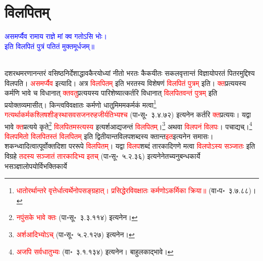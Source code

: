 \section[विलपितम्]{विलपितम्}
\centering\textcolor{blue}{असमर्प्यैव रामाय राज्ञे मां क्व गतोऽसि भोः।\nopagebreak\\
इति विलपितं पुत्रं पतितं मुक्तमूर्धजम्॥}\nopagebreak\\
\\
\begin{sloppypar}\justifying\noindent\hspace{10mm} दशरथ\-मरणानन्तरं वसिष्ठ\-निर्देशाद्धावकैरयोध्यां नीतो भरतः कैकयीतः सकल\-वृत्तान्तं विज्ञायोपरतं पितरमुद्दिश्य विलपति। \textcolor{red}{असमर्प्यैव} इत्यादि। अत्र \textcolor{red}{विलपितम्} इति भरतस्य विशेषणं \textcolor{red}{विलपितं पुत्रम्} इति। \textcolor{red}{क्त}\-प्रत्ययस्य कर्मणि भावे च विधानात् \textcolor{red}{क्तवतु}\-प्रत्ययस्य पारिशेष्यात्कर्तरि विधानात् \textcolor{red}{विलपितवन्तं पुत्रम्} इति प्रयोक्तव्यमासीत्। किन्त्वविवक्षातः कर्मणो धातुमिममकर्मकं मत्वा\footnote{\textcolor{red}{धातोरर्थान्तरे वृत्तेर्धात्वर्थेनोपसङ्ग्रहात्। प्रसिद्धेरविवक्षातः कर्मणोऽकर्मिका क्रिया॥} (वा॰प॰~३.७.८८)।} \textcolor{red}{गत्यर्थाकर्मक\-श्लिष\-शीङ्स्थास\-वस\-जन\-रुह\-जी\-र्यतिभ्यश्च} (पा॰सू॰~३.४.७२) इत्यनेन कर्तरि \textcolor{red}{क्त}\-प्रत्ययः। यद्वा भावे \textcolor{red}{क्त}\-प्रत्यये कृते\footnote{\textcolor{red}{नपुंसके भावे क्तः} (पा॰सू॰~३.३.११४) इत्यनेन।} \textcolor{red}{विलपितमस्त्यस्य} इत्यर्शआद्यजन्तं \textcolor{red}{विलपितम्}।\footnote{\textcolor{red}{अर्शआदिभ्योऽच्} (पा॰सू॰~५.२.१२७) इत्यनेन।}
अथवा \textcolor{red}{विलपनं विलपः}। 
पचाद्यच्।\footnote{\textcolor{red}{अजपि सर्वधातुभ्यः} (वा॰~३.१.१३४) इत्यनेन। बाहुलकाद्भावे। 
} \textcolor{red}{विलपमितो विलपितस्तं विलपितम्} इति द्वितीयान्त\-विलप\-शब्दस्य क्तान्त\-\textcolor{red}{इत}\-इत्यनेन समासः। शकन्ध्वादित्वात्पूर्वोक्त\-दिशा पर\-रूपे \textcolor{red}{विलपितम्}। यद्वा \textcolor{red}{विलप}\-शब्दं तारकादि\-गणे मत्वा 
\textcolor{red}{विलपोऽस्य सञ्जातः} 
इति विग्रहे \textcolor{red}{तदस्य सञ्जातं तारकादिभ्य इतच्} (पा॰सू॰~५.२.३६) इत्यनेनेतच्यनुबन्ध\-कार्ये
भ\-सञ्ज्ञालोपयोर्विभक्ति\-कार्ये

\end{sloppypar}

